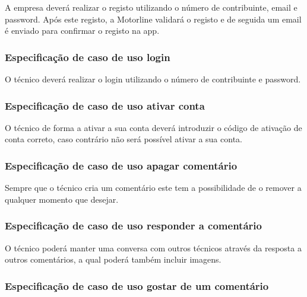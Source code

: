 A empresa deverá realizar o registo utilizando o número de contribuinte, email e password. Após este 
registo, a Motorline validará o registo e de seguida um email é enviado para confirmar o registo na app.



\subsubsection{Especificação de caso de uso login}

O técnico deverá realizar o login utilizando o número de contribuinte e password.



\subsubsection{Especificação de caso de uso ativar conta}

O técnico de forma a ativar a sua conta deverá introduzir o código de ativação de conta correto, 
caso contrário não será possível ativar a sua conta.



\newpage

\subsubsection{Especificação de caso de uso apagar comentário}

Sempre que o técnico cria um comentário este tem a possibilidade de o remover a qualquer momento que 
desejar.




\subsubsection{Especificação de caso de uso responder a comentário}

O técnico poderá manter uma conversa com outros técnicos através da resposta a outros comentários, 
a qual poderá também incluir imagens.



\newpage

\subsubsection{Especificação de caso de uso gostar de um comentário}

